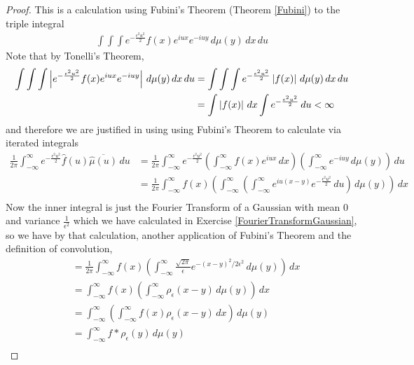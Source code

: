 \begin{proof}
This is a calculation using Fubini's Theorem (Theorem \ref{Fubini}) to
the triple integral
\begin{align*}
\int \int \int e^{-\frac{\epsilon^2 u^2}{2}} f(x) e^{iux} e^{-iuy}
\, d\mu(y) \, dx \, du
\end{align*}
Note that by Tonelli's Theorem, 
\begin{align*}
\int \int \int \left \vert  e^{-\frac{\epsilon^2 u^2}{2}} f(x) e^{iux} e^{-iuy} \right \vert
\, d\mu(y) \, dx \, du &= \int \int \int e^{-\frac{\epsilon^2 u^2}{2}} \left \vert  f(x) \right \vert 
\, d\mu(y) \, dx \, du \\
&=\int \left \vert  f(x) \right \vert  \, dx \int e^{-\frac{\epsilon^2 u^2}{2}} \, du < \infty
\end{align*}
and therefore we are justified in using using Fubini's Theorem to
calculate via iterated integrals
\begin{align*}
 \frac{1}{2 \pi} \int_{-\infty}^\infty e^{-\frac{\epsilon^2 u^2}{2}} \hat{f}(u)
 \overline{\hat{\mu}(u)}\, du &=  \frac{1}{2 \pi} \int_{-\infty}^\infty
 e^{-\frac{\epsilon^2 u^2}{2}} \left( \int_{-\infty}^\infty f(x)e^{iux} \, dx \right )
 \left (\int_{-\infty}^\infty e^{-iuy} \, d\mu(y) \right )\, du \\
&=  \frac{1}{2 \pi} \int_{-\infty}^\infty f(x)
\left( \int_{-\infty}^\infty 
 \left (\int_{-\infty}^\infty e^{iu(x-y)}  e^{-\frac{\epsilon^2 u^2}{2}}
   \, du \right ) \, d\mu(y) \right ) \, dx\\
\end{align*}
Now the inner integral is just the Fourier Transform of a Gaussian
with mean $0$ and variance $\frac{1}{\epsilon^2}$ which we have calculated in Exercise \ref {FourierTransformGaussian},
so we have by that calculation, another application of Fubini's
Theorem and the definition of convolution,
\begin{align*}
&= \frac{1}{2 \pi} \int_{-\infty}^\infty f(x)
\left( \int_{-\infty}^\infty \frac{\sqrt{2\pi}}{\epsilon}
  e^{-(x-y)^2/2\epsilon^2} \, d\mu(y) \right ) \, dx\\
&= \int_{-\infty}^\infty f(x)
\left( \int_{-\infty}^\infty \rho_\epsilon(x -y) \, d\mu(y) \right ) \, dx\\
&= \int_{-\infty}^\infty 
\left( \int_{-\infty}^\infty f(x) \rho_\epsilon(x -y) \, dx \right )
\, d\mu(y) \\
&= \int_{-\infty}^\infty f * \rho_\epsilon(y) \, d\mu(y) \\
\end{align*}


\end{proof}
